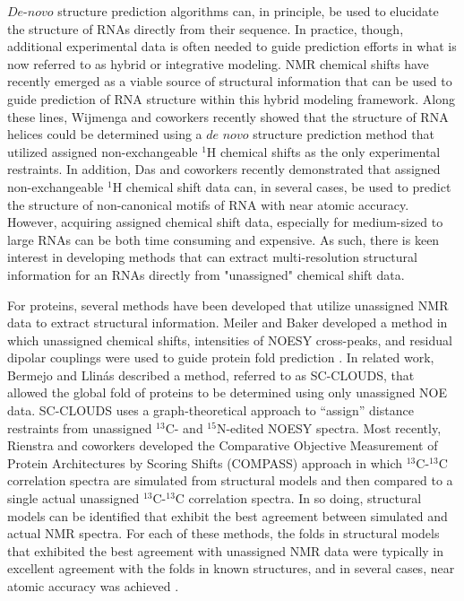 \documentclass[journal=jcisd8,manuscript=article,layout=onecolumn]{achemso}
\begin{document}
$\textit{De-novo}$ structure prediction algorithms can, in principle, be used to elucidate the structure of RNAs directly from their sequence. In practice, though, additional experimental data is often needed to guide prediction efforts in what is now referred to as hybrid or integrative modeling\cite{burke2012structure, lee2016integrative}. NMR chemical shifts have recently emerged as a viable source of structural information that can be used to guide prediction of RNA structure within this hybrid modeling framework. Along these lines, Wijmenga and coworkers recently showed that the structure of RNA helices could be determined using a $\textit{de novo}$ structure prediction method that utilized assigned non-exchangeable $^{1}$H chemical shifts  as the only experimental restraints\cite{van2013nucleic}.  In addition, Das and coworkers recently demonstrated that assigned non-exchangeable $^{1}$H chemical shift  data can, in several cases, be used to predict the structure of non-canonical motifs of RNA with near atomic accuracy\cite{sripakdeevong2014structure}. However, acquiring assigned chemical shift data, especially for medium-sized to large RNAs can be both time consuming and expensive. As such, there is keen interest in developing methods that can extract multi-resolution structural information for an RNAs directly from "unassigned" chemical shift data.

For proteins, several methods have been developed that utilize unassigned NMR data to extract structural information. Meiler and Baker developed a method in which unassigned chemical shifts, intensities of NOESY cross-peaks, and residual dipolar couplings were used to guide protein fold prediction \cite{meiler2003rapid}. In related work, Bermejo and Llin{\'a}s described a method, referred to as SC-CLOUDS, that allowed the global fold of proteins to be determined using only unassigned NOE data. SC-CLOUDS uses a graph-theoretical approach to ``assign'' distance restraints from unassigned $^{13}$C- and $^{15}$N-edited NOESY spectra\cite{bermejo2008deuterated}. Most recently, Rienstra and coworkers developed the Comparative Objective Measurement of Protein Architectures by Scoring Shifts (COMPASS) approach in which $^{13}$C-$^{13}$C correlation spectra are simulated from structural models and then compared to a single actual unassigned  $^{13}$C-$^{13}$C correlation spectra\cite{courtney2015experimental}. In so doing, structural models can be identified that exhibit the best agreement between simulated and actual NMR spectra. For each of these methods, the folds in structural models that exhibited the best agreement with unassigned NMR data were typically in excellent agreement with the folds in known structures, and in several cases, near atomic accuracy was achieved \cite{meiler2003rapid, courtney2015experimental}. 
\end{document}
